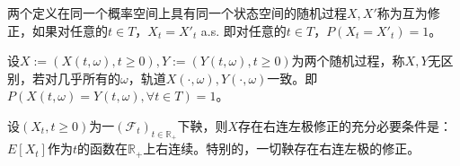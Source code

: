 \documentclass[lang=cn,10pt,thmcnt=section]{elegantbook}
\begin{document}
\begin{definition}
	两个定义在同一个概率空间上具有同一个状态空间的随机过程$X, X'$称为互为修正，如果对任意的$t \in T$，$X_t = X'_t$ a.s. 即对任意的$t \in T$，$P(X_t = X'_t) = 1$。
\end{definition}
\begin{definition}
	设$X := (X(t, \omega), t \geq 0), Y := (Y(t, \omega), t \geq 0)$为两个随机过程，称$X, Y$无区别，若对几乎所有的$\omega$，轨道$X(\cdot, \omega), Y(\cdot, \omega)$一致。即$P(X(t, \omega) = Y(t, \omega), \forall t \in T) = 1$。
\end{definition}
\begin{theorem}
	设$(X_t, t \geq 0)$为一$(\mathcal{F}_t)_{t \in \mathbb{R}_+}$下鞅，则$X$存在右连左极修正的充分必要条件是：$E[X_t]$作为$t$的函数在$\mathbb{R}_+$上右连续。特别的，一切鞅存在右连左极的修正。
\end{theorem}
\end{document}

